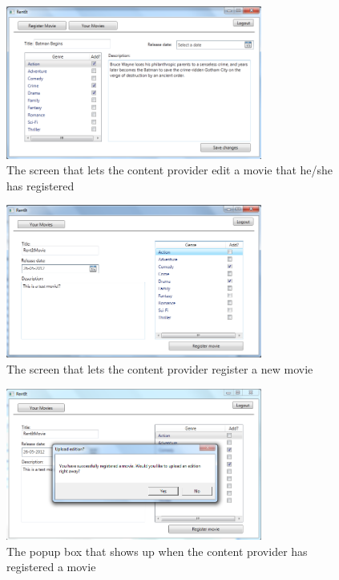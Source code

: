 \begin{figure}[h!]
  \centering
    \includegraphics[width=0.75\textwidth]{Parts/Appendix/Images/CPEditmovie}
  \caption{The screen that lets the content provider edit a movie that he/she has registered}
  \label{fig:Appendix_GUI_PrototypeCPEditmovie}
\end{figure}

\begin{figure}[h!]
  \centering
    \includegraphics[width=0.75\textwidth]{Parts/Appendix/Images/CPRegistermovie}
  \caption{The screen that lets the content provider register a new movie}
  \label{fig:Appendix_GUI_PrototypeCPRegister}
\end{figure}

\clearpage

\begin{figure}[h!]
  \centering
    \includegraphics[width=0.75\textwidth]{Parts/Appendix/Images/CPRegisterPopup}
  \caption{The popup box that shows up when the content provider has registered a movie}
  \label{fig:Appendix_GUI_PrototypeCPRegisterpopup}
\end{figure}

